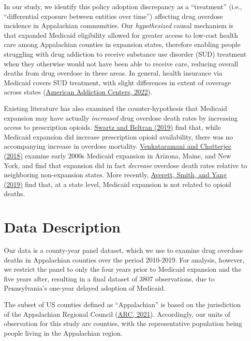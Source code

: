 \documentclass[
  11pt,
]{article}
\begin{document}
In our study, we identify this policy adoption discrepancy as a
``treatment'' (i.e., ``differential exposure between entities over
time'') affecting drug overdose incidence in Appalachian communities.
Our \emph{hypothesized} causal mechanism is that expanded Medicaid
eligibility allowed for greater access to low-cost health care among
Appalachian counties in expansion states, therefore enabling people
struggling with drug addiction to receive substance use disorder (SUD)
treatment when they otherwise would not have been able to receive care,
reducing overall deaths from drug overdose in these areas. In general,
health insurance via Medicaid covers SUD treatment, with slight
differences in extent of coverage across states
(\href{https://rehabs.com/insurance-coverage/medicaid/}{American
Addiction Centers, 2022}).

Existing literature has also examined the counter-hypothesis that
Medicaid expansion may have actually \emph{increased} drug overdose
death rates by increasing access to prescription opioids.
\href{https://onlinelibrary.wiley.com/doi/epdf/10.1111/add.14741}{Swartz
and Beltran (2019)} find that, while Medicaid expansion did increase
prescription opioid availability, there was no accompanying increase in
overdose mortality.
\href{https://www.ncbi.nlm.nih.gov/pmc/articles/PMC6318168/}{Venkataramani
and Chatterjee (2018)} examine early 2000s Medicaid expansion in
Arizona, Maine, and New York, and find that expansion did in fact
\emph{decrease} overdose death rates relative to neighboring
non-expansion states. More recently,
\href{https://onlinelibrary.wiley.com/doi/10.1002/hec.3945}{Averett,
Smith, and Yang (2019)} find that, at a state level, Medicaid expansion
is not related to opioid deaths.

\medspace

\hypertarget{data-description}{%
\section{Data Description}\label{data-description}}

Our data is a county-year panel dataset, which we use to examine drug
overdose deaths in Appalachian counties over the period 2010-2019. For
analysis, however, we restrict the panel to only the four years prior to
Medicaid expansion and the five years after, resulting in a final
dataset of 3807 observations, due to Pennsylvania's one-year delayed
adoption of Medicaid.

The subset of US counties defined as ``Appalachian'' is based on the
jurisdiction of the Appalachian Regional Council
(\href{https://www.arc.gov/appalachian-counties-served-by-arc/}{ARC,
2021}). Accordingly, our units of observation for this study are
counties, with the representative population being people living in the
Appalachian region.
\end{document}
